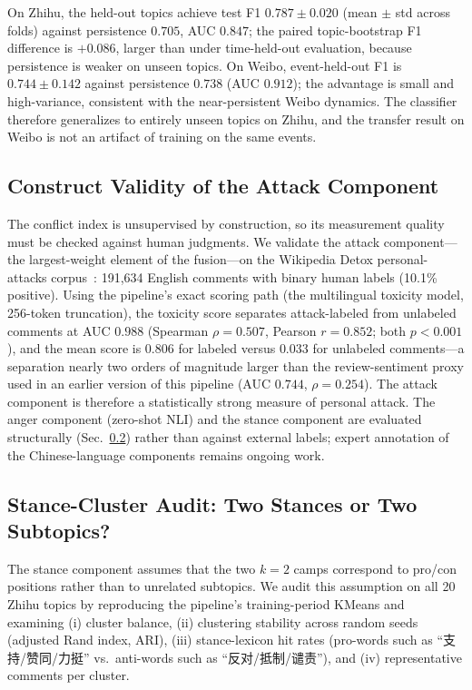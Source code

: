 \documentclass[journal]{IEEEtran}
\begin{document}
On Zhihu, the held-out topics achieve test F1 $0.787\pm0.020$ (mean $\pm$ std across folds) against persistence $0.705$, AUC $0.847$; the paired topic-bootstrap F1 difference is $+0.086$, larger than under time-held-out evaluation, because persistence is weaker on unseen topics. On Weibo, event-held-out F1 is $0.744\pm0.142$ against persistence $0.738$ (AUC $0.912$); the advantage is small and high-variance, consistent with the near-persistent Weibo dynamics. The classifier therefore generalizes to entirely unseen topics on Zhihu, and the transfer result on Weibo is not an artifact of training on the same events.

\subsection{Construct Validity of the Attack Component}\label{sec:construct_validity}

The conflict index is unsupervised by construction, so its measurement quality must be checked against human judgments. We validate the attack component---the largest-weight element of the fusion---on the Wikipedia Detox personal-attacks corpus~\cite{Wulczyn2017}: 191,634 English comments with binary human labels (10.1\% positive). Using the pipeline's exact scoring path (the multilingual toxicity model, 256-token truncation), the toxicity score separates attack-labeled from unlabeled comments at AUC $0.988$ (Spearman $\rho=0.507$, Pearson $r=0.852$; both $p<0.001$), and the mean score is $0.806$ for labeled versus $0.033$ for unlabeled comments---a separation nearly two orders of magnitude larger than the review-sentiment proxy used in an earlier version of this pipeline (AUC $0.744$, $\rho=0.254$). The attack component is therefore a statistically strong measure of personal attack. The anger component (zero-shot NLI) and the stance component are evaluated structurally (Sec.~\ref{sec:stance_audit}) rather than against external labels; expert annotation of the Chinese-language components remains ongoing work.

\subsection{Stance-Cluster Audit: Two Stances or Two Subtopics?}\label{sec:stance_audit}

The stance component assumes that the two $k{=}2$ camps correspond to pro/con positions rather than to unrelated subtopics. We audit this assumption on all 20 Zhihu topics by reproducing the pipeline's training-period KMeans and examining (i) cluster balance, (ii) clustering stability across random seeds (adjusted Rand index, ARI), (iii) stance-lexicon hit rates (pro-words such as ``支持/赞同/力挺'' vs.\ anti-words such as ``反对/抵制/谴责''), and (iv) representative comments per cluster.
\end{document}
